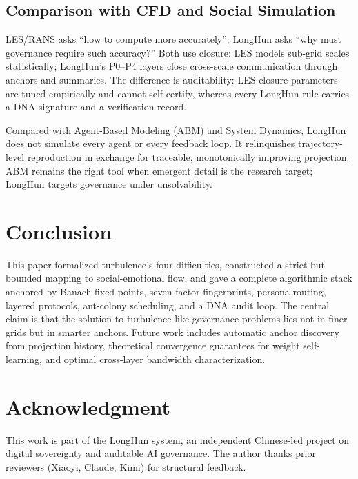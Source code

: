 \documentclass[10pt,a4paper]{article}
\theoremstyle{definition}
\begin{document}
\subsection{Comparison with CFD and Social Simulation}

LES/RANS asks ``how to compute more accurately''; LongHun asks ``why must governance require such accuracy?'' Both use closure: LES models sub-grid scales statistically; LongHun's P0--P4 layers close cross-scale communication through anchors and summaries. The difference is auditability: LES closure parameters are tuned empirically and cannot self-certify, whereas every LongHun rule carries a DNA signature and a verification record.

Compared with Agent-Based Modeling (ABM) and System Dynamics\cite{Epstein1996,Forrester1971}, LongHun does not simulate every agent or every feedback loop. It relinquishes trajectory-level reproduction in exchange for traceable, monotonically improving projection. ABM remains the right tool when emergent detail is the research target; LongHun targets governance under unsolvability.

\section{Conclusion}\label{sec:conclusion}

This paper formalized turbulence's four difficulties, constructed a strict but bounded mapping to social-emotional flow, and gave a complete algorithmic stack anchored by Banach fixed points, seven-factor fingerprints, persona routing, layered protocols, ant-colony scheduling, and a DNA audit loop. The central claim is that the solution to turbulence-like governance problems lies not in finer grids but in smarter anchors. Future work includes automatic anchor discovery from projection history, theoretical convergence guarantees for weight self-learning, and optimal cross-layer bandwidth characterization.

\section*{Acknowledgment}

This work is part of the LongHun system, an independent Chinese-led project on digital sovereignty and auditable AI governance. The author thanks prior reviewers (Xiaoyi, Claude, Kimi) for structural feedback.


\end{document}
